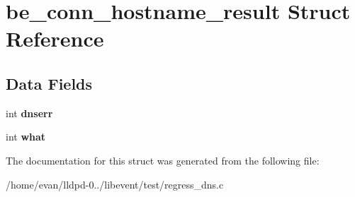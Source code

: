 \section{be\-\_\-conn\-\_\-hostname\-\_\-result \-Struct \-Reference}
\label{structbe__conn__hostname__result}
\subsection*{\-Data \-Fields}
\begin{DoxyCompactItemize}
\item 
int {\bfseries dnserr}\label{structbe__conn__hostname__result_a9164f29f6d22021dec3395d405bc0c7d}

\item 
int {\bfseries what}\label{structbe__conn__hostname__result_aa95e12539c28b142fea5f8c3a8606deb}

\end{DoxyCompactItemize}


\-The documentation for this struct was generated from the following file\-:\begin{DoxyCompactItemize}
\item 
/home/evan/lldpd-\/0../libevent/test/regress\-\_\-dns.\-c\end{DoxyCompactItemize}
